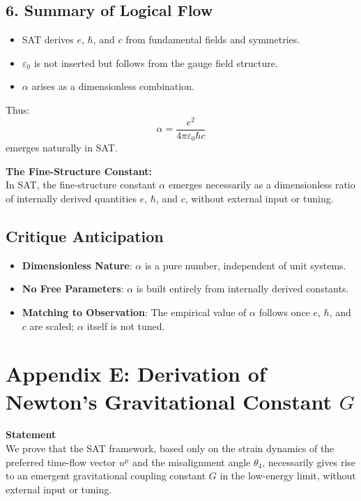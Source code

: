 \documentclass[12pt]{article}
\begin{document}
\subsection*{6. Summary of Logical Flow}
\begin{itemize}
    \item SAT derives \(e\), \(\hbar\), and \(c\) from fundamental fields and symmetries.
    \item \(\varepsilon_0\) is not inserted but follows from the gauge field structure.
    \item \(\alpha\) arises as a dimensionless combination.
\end{itemize}
Thus:
\[
\boxed{ \alpha = \frac{e^2}{4\pi \varepsilon_0 \hbar c} }
\]
emerges naturally in SAT.

\begin{mdframed}[linewidth=1pt, roundcorner=5pt, backgroundcolor=white]
\textbf{The Fine-Structure Constant:} \\
In SAT, the fine-structure constant \( \alpha \) emerges necessarily as a dimensionless ratio of internally derived quantities \( e \), \( \hbar \), and \( c \), without external input or tuning.
\end{mdframed}

\subsection*{Critique Anticipation}
\begin{itemize}
    \item \textbf{Dimensionless Nature}: \(\alpha\) is a pure number, independent of unit systems.
    \item \textbf{No Free Parameters}: \(\alpha\) is built entirely from internally derived constants.
    \item \textbf{Matching to Observation}: The empirical value of \(\alpha\) follows once \(e\), \(\hbar\), and \(c\) are scaled; \(\alpha\) itself is not tuned.
\end{itemize}

\newpage
\section*{Appendix E: Derivation of Newton’s Gravitational Constant \(G\)}

\textbf{Statement} \\
We prove that the SAT framework, based only on the strain dynamics of the preferred time-flow vector \(u^\mu\) and the misalignment angle \(\theta_4\), necessarily gives rise to an emergent gravitational coupling constant \(G\) in the low-energy limit, without external input or tuning.
\end{document}
